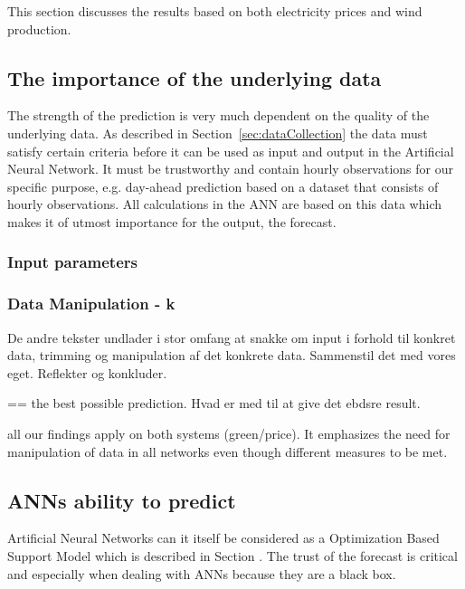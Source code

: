 This section discusses the results based on both electricity prices and wind production.

\subsection{The importance of the underlying data}
The strength of the prediction is very much dependent on the quality of the underlying data. As described in Section~\ref{sec:dataCollection} the data must satisfy certain criteria before it can be used as input and output in the Artificial Neural Network. It must be trustworthy and contain hourly observations for our specific purpose, e.g. day-ahead prediction based on a dataset that consists of hourly observations. All calculations in the ANN are based on this data which makes it of utmost importance for the output, the forecast.

\subsubsection{Input parameters}


\subsubsection{Data Manipulation - k}
De andre tekster undlader i stor omfang at snakke om input i forhold til konkret data, trimming og manipulation af det konkrete data. Sammenstil det med vores eget. Reflekter og konkluder.

== the best possible prediction. Hvad er med til at give det ebdsre result.

all our findings apply on both systems (green/price). It emphasizes the need for manipulation of data in all networks even though different measures to be met.

\subsection{ANNs ability to predict}


Artificial Neural Networks can it itself be considered as a Optimization Based Support Model which is described in Section . The trust of the forecast is critical and especially when dealing with ANNs because they are a black box. 


